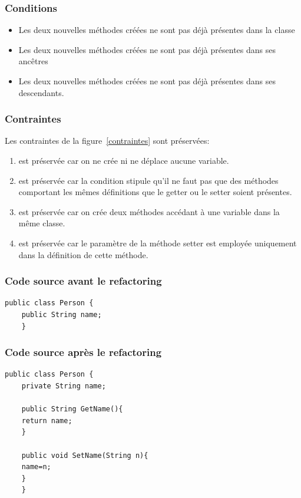 \documentclass[a4paper, 12pt]{article}
\begin{document}
  \subsubsection{Conditions}

  \begin{itemize}[label=\textbullet]
    \item Les deux nouvelles méthodes créées ne sont pas déjà présentes dans la classe
    \item Les deux nouvelles méthodes créées ne sont pas déjà présentes dans ses ancêtres
    \item Les deux nouvelles méthodes créées ne sont pas déjà présentes dans ses descendants.
  \end{itemize}

  \subsubsection{Contraintes}

  Les contraintes de la figure~\ref{contraintes} sont préservées:
  \begin{enumerate}
    \item est préservée car on ne crée ni ne déplace aucune variable.
    \item est préservée car la condition stipule qu'il ne faut pas que des méthodes comportant les mêmes définitions que le getter ou le setter soient présentes.
    \item est préservée car on crée deux méthodes accédant à une variable dans la même classe.
    \item est préservée car le paramètre de la méthode setter est employée uniquement dans la définition de cette méthode.
  \end{enumerate}

  \subsubsection{Code source avant le refactoring}

  \begin{lstlisting}[frame=single]
    public class Person {
    public String name;
    }
  \end{lstlisting}

  \subsubsection{Code source après le refactoring}

  \begin{lstlisting}[frame=single]
    public class Person {
    private String name;

    public String GetName(){
    return name;
    }

    public void SetName(String n){
    name=n;
    }
    }
  \end{lstlisting}
\end{document}
